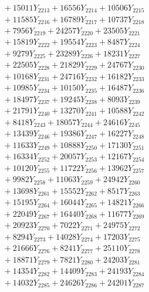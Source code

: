 \documentclass[a4paper,10pt]{article}
\begin{document}
{\begin{align}
&\;  + 15011 Y_{2213} + 16556 Y_{2214} + 10506 Y_{2215} \\[0.3ex]
&\;  + 11585 Y_{2216} + 16789 Y_{2217} + 10737 Y_{2218} \\[0.5ex]\allowbreak
&\;  + 7956 Y_{2219} + 24257 Y_{2220} + 23505 Y_{2221} \\[0.3ex]
&\;  + 15819 Y_{2222} + 19554 Y_{2223} + 8487 Y_{2224} \\[0.3ex]
&\;  + 9279 Y_{2225} + 23289 Y_{2226} + 18231 Y_{2227} \\[0.3ex]
&\;  + 22505 Y_{2228} + 21829 Y_{2229} + 24767 Y_{2230} \\[0.3ex]
&\;  + 10168 Y_{2231} + 24716 Y_{2232} + 16182 Y_{2233} \\[0.3ex]
&\;  + 10985 Y_{2234} + 10150 Y_{2235} + 16487 Y_{2236} \\[0.3ex]
&\;  + 18497 Y_{2237} + 19245 Y_{2238} + 8093 Y_{2239} \\[0.3ex]
&\;  + 21791 Y_{2240} + 13270 Y_{2241} + 10588 Y_{2242} \\[0.3ex]
&\;  + 8418 Y_{2243} + 18057 Y_{2244} + 24616 Y_{2245} \\[0.3ex]
&\;  + 13439 Y_{2246} + 19386 Y_{2247} + 16227 Y_{2248} \\[0.5ex]\allowbreak
&\;  + 11633 Y_{2249} + 10888 Y_{2250} + 17130 Y_{2251} \\[0.3ex]
&\;  + 16334 Y_{2252} + 20057 Y_{2253} + 12167 Y_{2254} \\[0.3ex]
&\;  + 10120 Y_{2255} + 11722 Y_{2256} + 13962 Y_{2257} \\[0.3ex]
&\;  + 9982 Y_{2258} + 11063 Y_{2259} + 24942 Y_{2260} \\[0.3ex]
&\;  + 13698 Y_{2261} + 15552 Y_{2262} + 8517 Y_{2263} \\[0.3ex]
&\;  + 15195 Y_{2264} + 16044 Y_{2265} + 14821 Y_{2266} \\[0.3ex]
&\;  + 22049 Y_{2267} + 16440 Y_{2268} + 11677 Y_{2269} \\[0.3ex]
&\;  + 20923 Y_{2270} + 7022 Y_{2271} + 24975 Y_{2272} \\[0.3ex]
&\;  + 8294 Y_{2273} + 14028 Y_{2274} + 17203 Y_{2275} \\[0.3ex]
&\;  + 21666 Y_{2276} + 8241 Y_{2277} + 25110 Y_{2278} \\[0.5ex]\allowbreak
&\;  + 18871 Y_{2279} + 7821 Y_{2280} + 24203 Y_{2281} \\[0.3ex]
&\;  + 14354 Y_{2282} + 14409 Y_{2283} + 24193 Y_{2284} \\[0.3ex]
&\;  + 14032 Y_{2285} + 24626 Y_{2286} + 24201 Y_{2287} \\[0.3ex]

\end{align}}
\end{document}

